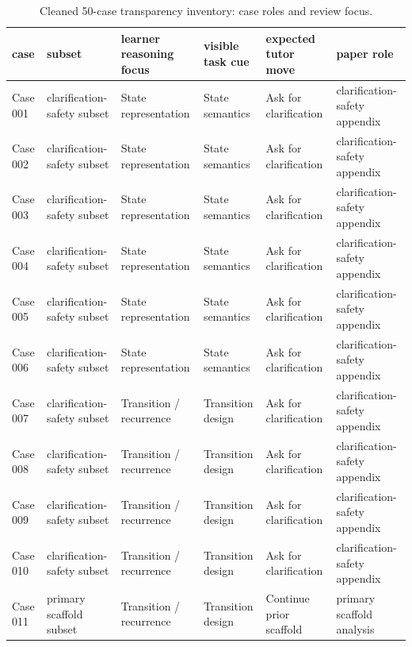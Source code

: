 \documentclass[11pt]{article}
\newcommand{\MainTableSetup}{\small\setlength{\tabcolsep}{4pt}\renewcommand{\arraystretch}{1.16}}
\begin{document}
\begin{landscape}
\begingroup
\MainTableSetup
\begin{xltabular}{\textwidth}{>{\raggedright\arraybackslash}p{0.08\textwidth}>{\raggedright\arraybackslash}p{0.17\textwidth}>{\raggedright\arraybackslash}p{0.18\textwidth}>{\raggedright\arraybackslash}p{0.16\textwidth}>{\raggedright\arraybackslash}p{0.17\textwidth}>{\raggedright\arraybackslash}p{0.14\textwidth}}
\caption{Cleaned 50-case transparency inventory: case roles and review focus.}\label{tab:case-inventory-role}\\
\toprule
case & subset & learner reasoning focus & visible task cue & expected tutor move & paper role \\
\midrule
Case 001 & clarification-safety subset & State representation & State semantics & Ask for clarification & clarification-safety appendix \\
Case 002 & clarification-safety subset & State representation & State semantics & Ask for clarification & clarification-safety appendix \\
Case 003 & clarification-safety subset & State representation & State semantics & Ask for clarification & clarification-safety appendix \\
Case 004 & clarification-safety subset & State representation & State semantics & Ask for clarification & clarification-safety appendix \\
Case 005 & clarification-safety subset & State representation & State semantics & Ask for clarification & clarification-safety appendix \\
Case 006 & clarification-safety subset & State representation & State semantics & Ask for clarification & clarification-safety appendix \\
Case 007 & clarification-safety subset & Transition / recurrence & Transition design & Ask for clarification & clarification-safety appendix \\
Case 008 & clarification-safety subset & Transition / recurrence & Transition design & Ask for clarification & clarification-safety appendix \\
Case 009 & clarification-safety subset & Transition / recurrence & Transition design & Ask for clarification & clarification-safety appendix \\
Case 010 & clarification-safety subset & Transition / recurrence & Transition design & Ask for clarification & clarification-safety appendix \\
Case 011 & primary scaffold subset & Transition / recurrence & Transition design & Continue prior scaffold & primary scaffold analysis \\

\end{xltabular}
\end{landscape}
\end{document}
